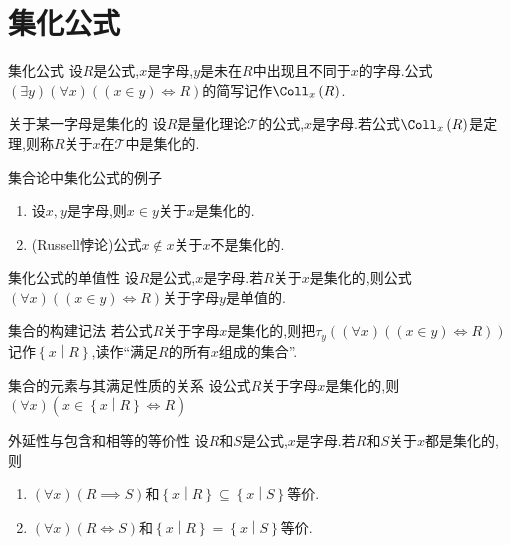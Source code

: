 \section{集化公式}

\begin{definition}{集化公式}{}
	设$R$是公式,$x$是字母,$y$是未在$R$中出现且不同于$x$的字母.公式$\left(\exists y\right)\left(\forall x\right)\left(\left(x\in y\right)\iff R\right)$的简写记作$\Coll_{x}\left(R\right)$.
\end{definition}

\begin{definition}{关于某一字母是集化的}{}
	设$R$是量化理论$\mathcal{T}$的公式,$x$是字母.若公式$\Coll_{x}\left(R\right)$是定理,则称$R$关于$x$在$\mathcal{T}$中是集化的.
\end{definition}

\begin{example}{集合论中集化公式的例子}{}
	\begin{enumerate}
		\item 设$x,y$是字母,则$x\in y$关于$x$是集化的.
		\item (Russell悖论)公式$x\notin x$关于$x$不是集化的.
	\end{enumerate}
\end{example}

\begin{metatheorem}{集化公式的单值性}{}
	设$R$是公式,$x$是字母.若$R$关于$x$是集化的,则公式$\left(\forall x\right)\left(\left(x\in y\right)\iff R\right)$关于字母$y$是单值的.
\end{metatheorem}

\begin{definition}{集合的构建记法}{}
	若公式$R$关于字母$x$是集化的,则把$\tau_{y}\left(\left(\forall x\right)\left(\left(x\in y\right)\iff R\right)\right)$记作$\left\{x\middle|R\right\}$,读作``满足$R$的所有$x$组成的集合''.
\end{definition}

\begin{metatheorem}{集合的元素与其满足性质的关系}{}
	设公式$R$关于字母$x$是集化的,则$\left(\forall x\right)\left(x\in\left\{x\middle|R\right\}\iff R\right)$
\end{metatheorem}

\begin{metatheorem}{外延性与包含和相等的等价性}{}
	设$R$和$S$是公式,$x$是字母.若$R$和$S$关于$x$都是集化的,则
	\begin{enumerate}
		\item $\left(\forall x\right)\left(R\implies S\right)$和$\left\{x\middle|R\right\}\subseteq\left\{x\middle|S\right\}$等价.
		\item $\left(\forall x\right)\left(R\iff S\right)$和$\left\{x\middle|R\right\}=\left\{x\middle|S\right\}$等价.
	\end{enumerate}
\end{metatheorem}
